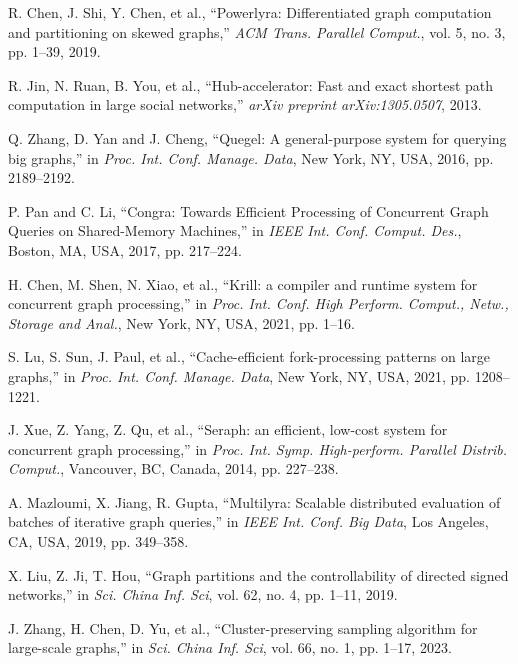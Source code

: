 \documentclass[10pt,journal,compsoc]{IEEEtran}
\begin{document}
\begin{thebibliography}{100}
R. Chen, J. Shi, Y. Chen, et al., ``Powerlyra: Differentiated graph computation and partitioning on skewed graphs,'' \textit{ACM Trans. Parallel Comput.}, vol. 5, no. 3, pp. 1--39, 2019.

R. Jin, N. Ruan, B. You, et al., ``Hub-accelerator: Fast and exact shortest path computation in large social networks,'' \textit{arXiv preprint arXiv:1305.0507}, 2013.

Q. Zhang, D. Yan and J. Cheng, ``Quegel: A general-purpose system for querying big graphs,'' in \textit{Proc. Int. Conf. Manage. Data}, New York, NY, USA, 2016, pp. 2189--2192.

P. Pan and C. Li, ``Congra: Towards Efficient Processing of Concurrent Graph Queries on Shared-Memory Machines,'' in \textit{IEEE Int. Conf. Comput. Des.}, Boston, MA, USA, 2017, pp. 217--224.

H. Chen, M. Shen, N. Xiao, et al., ``Krill: a compiler and runtime system for concurrent graph processing,'' in \textit{Proc. Int. Conf. High Perform. Comput., Netw., Storage and Anal.}, New York, NY, USA, 2021, pp. 1--16.

S. Lu, S. Sun, J. Paul, et al., ``Cache-efficient fork-processing patterns on large graphs,'' in \textit{Proc. Int. Conf. Manage. Data}, New York, NY, USA, 2021, pp. 1208--1221.

J. Xue, Z. Yang, Z. Qu, et al., ``Seraph: an efficient, low-cost system for concurrent graph processing,'' in \textit{Proc. Int. Symp. High-perform. Parallel Distrib. Comput.}, Vancouver, BC, Canada, 2014, pp. 227--238.

A. Mazloumi, X. Jiang, R. Gupta, ``Multilyra: Scalable distributed evaluation of batches of iterative graph queries,'' in \textit{IEEE Int. Conf. Big Data}, Los Angeles, CA, USA, 2019, pp. 349--358.

X. Liu, Z. Ji, T. Hou, ``Graph partitions and the controllability of directed signed networks,'' in \textit{Sci. China Inf. Sci}, vol. 62, no. 4, pp. 1--11, 2019.

J. Zhang, H. Chen, D. Yu, et al., ``Cluster-preserving sampling algorithm for large-scale graphs,'' in \textit{Sci. China Inf. Sci}, vol. 66, no. 1, pp. 1--17, 2023.

\end{thebibliography}

\end{document}
